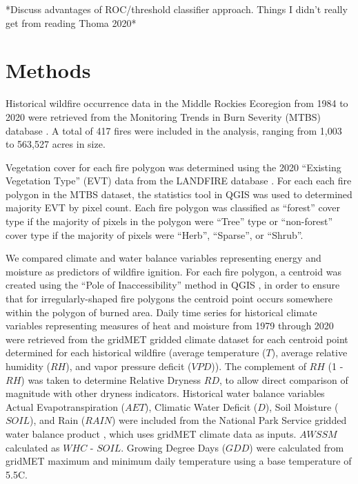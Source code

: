 \documentclass[11pt]{article}
\begin{document}
*Discuss advantages of ROC/threshold classifier approach.  Things I didn't really get from reading Thoma 2020*

\section{Methods}

Historical wildfire occurrence data in the Middle Rockies Ecoregion from 1984 to 2020 were retrieved from the Monitoring Trends in Burn Severity (MTBS) database \citep{eidenshinkProjectMonitoringTrends2007}.  A total of 417 fires were included in the analysis, ranging from 1,003 to 563,527 acres in size.  

Vegetation cover for each fire polygon was determined using the 2020 ``Existing Vegetation Type'' (EVT) data from the LANDFIRE database \citep{rollinsLANDFIRENationallyConsistent2009}.  For each each fire polygon in the MTBS dataset, the statistics tool in QGIS was used to determined majority EVT by pixel count.  Each fire polygon was classified as ``forest'' cover type if the majority of pixels in the polygon were ``Tree'' type or ``non-forest'' cover type if the majority of pixels were ``Herb'', ``Sparse'', or ``Shrub''.  


We compared climate and water balance variables representing energy and moisture as predictors of wildfire ignition. For each fire polygon, a centroid was created using the ``Pole of Inaccessibility'' method in QGIS \citep{QGIS_software}, in order to ensure that for irregularly-shaped fire polygons the centroid point occurs somewhere within the polygon of burned area. Daily time series for historical climate variables representing measures of heat and moisture from 1979 through 2020 were retrieved from the gridMET gridded climate dataset \citep{abatzoglouDevelopmentGriddedSurface2013} for each centroid point determined for each historical wildfire (average temperature ($T$), average relative humidity ($RH$), and vapor pressure deficit ($VPD$)).  The complement of $RH$ (1 - $RH$) was taken to determine Relative Dryness $RD$, to allow direct comparison of magnitude with other dryness indicators. Historical water balance variables Actual Evapotranspiration ($AET$), Climatic Water Deficit ($D$), Soil Moisture ($SOIL$), and Rain ($RAIN$) were included from the National Park Service gridded water balance product \citep{tercekHistoricalChangesPlant2021}, which uses gridMET climate data as inputs.  $AWSSM$ calculated as $WHC$ - $SOIL$.  Growing Degree Days ($GDD$) were calculated from gridMET maximum and minimum daily temperature using a base temperature of 5.5\degree C.
\end{document}
